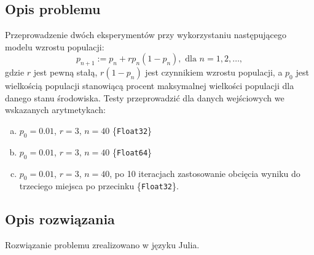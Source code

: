\documentclass{classrep}
\begin{document}
	\subsection{Opis problemu}
		Przeprowadzenie dwóch eksperymentów przy wykorzystaniu następującego modelu wzrostu populacji: $$p_{n+1} := p_n + rp_n(1-p_n), \text{ dla } n = 1, 2, \dots,$$
		gdzie $r$ jest pewną stałą, $r(1-p_n)$ jest czynnikiem wzrostu populacji, a $p_0$ jest wielkością populacji stanowiącą procent maksymalnej wielkości populacji dla danego stanu środowiska.
		Testy przeprowadzić dla danych wejściowych we wskazanych arytmetykach:
		\begin{enumerate}[(a)]
			\item $p_0 = 0.01$, $r = 3$, $n = 40$ \{\texttt{Float32}\}
			\item $p_0 = 0.01$, $r = 3$, $n = 40$ \{\texttt{Float64}\}
			\item $p_0 = 0.01$, $r = 3$, $n = 40$, po 10 iteracjach zastosowanie obcięcia wyniku do trzeciego miejsca po przecinku \{\texttt{Float32}\}.
		\end{enumerate}
	\subsection{Opis rozwiązania}
		Rozwiązanie problemu zrealizowano w języku Julia. 
\end{document}
